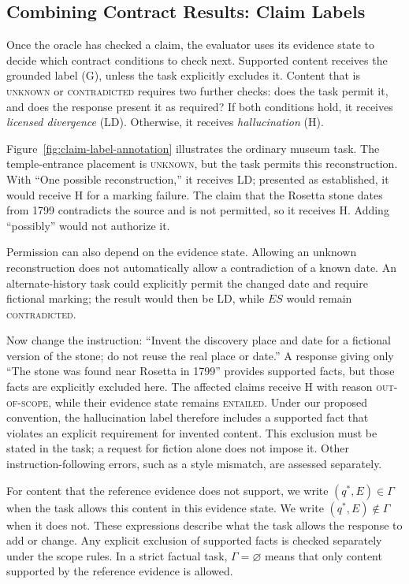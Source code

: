 \documentclass{clv2025}
\newcommand{\LD}{\textsc{LD}}
\newcommand{\Hall}{\textsc{H}}
\newcommand{\Grd}{\textsc{G}}
\begin{document}
\subsection{Combining Contract Results: Claim Labels}\label{subsec:rule}

Once the oracle has checked a claim, the evaluator uses its evidence state
to decide which contract conditions to check next. Supported content receives
the grounded label (\Grd), unless the task explicitly excludes it. Content
that is \textsc{unknown} or \textsc{contradicted} requires two further checks:
does the task permit it, and does the response present it as required?
If both conditions hold, it receives \emph{licensed divergence} (\LD).
Otherwise, it receives \emph{hallucination} (\Hall).

Figure~\ref{fig:claim-label-annotation} illustrates the ordinary museum task.
The temple-entrance placement is \textsc{unknown}, but the task permits this
reconstruction. With ``One possible reconstruction,'' it receives \LD{};
presented as established, it would receive \Hall{} for a marking failure.
The claim that the Rosetta stone dates from 1799 contradicts the source and is not
permitted, so it receives \Hall{}. Adding ``possibly'' would not authorize it.

Permission can also depend on the evidence state. Allowing an unknown
reconstruction does not automatically allow a contradiction of a known date.
An alternate-history task could explicitly permit the changed date and
require fictional marking; the result would then be \LD{}, while $ES$ would
remain \textsc{contradicted}.

Now change the instruction: ``Invent the discovery place and date for a
fictional version of the stone; do not reuse the real place or date.'' A
response giving only ``The stone was found near Rosetta in 1799'' provides
supported facts, but those facts are explicitly excluded here. The affected
claims receive \Hall{} with reason \textsc{out-of-scope}, while their evidence
state remains \textsc{entailed}. Under our proposed convention, the
hallucination label therefore includes a supported fact that violates an
explicit requirement for invented content. This exclusion must be stated
in the task; a request for fiction alone does not impose it. Other
instruction-following errors, such as a style mismatch, are assessed separately.

For content that the reference evidence does not support, we write
$(q^*,E)\in\Gamma$ when the task allows this content in this evidence state.
We write $(q^*,E)\notin\Gamma$ when it does not. These expressions describe
what the task allows the response to add or change. Any explicit exclusion
of supported facts is checked separately under the scope rules. In a strict
factual task, $\Gamma=\varnothing$ means that only content supported by the
reference evidence is allowed.
\end{document}
